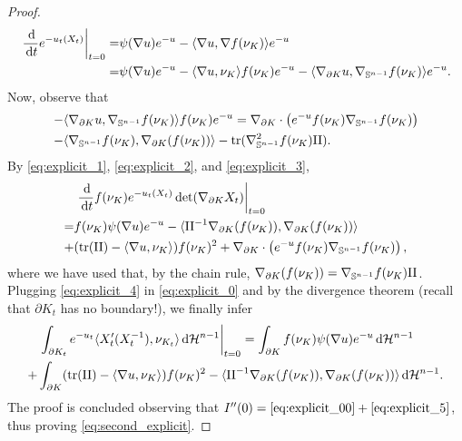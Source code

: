 \documentclass[a4paper, 11pt]{article}
\newcommand{\sph}{\mathbb{S}}
\newcommand{\haus}{\mathcal{H}}
\newcommand{\tra}{\mathrm{tr}}
\theoremstyle{definition}
\newcommand{\di}{\, \mathrm{d}}
\begin{document}
\begin{proof}
    \begin{align}\label{eq:explicit_2}
        \left. \frac{\di}{ \di t} e^{-u_t(X_t)}\right|_{t=0} = & \psi(\nabla u)e^{-u}-\langle \nabla u,  \nabla f(\nu_K)\rangle e^{-u} \\ = & \psi(\nabla u)e^{-u}-\langle \nabla u, \nu_K\rangle f(\nu_K) e^{-u}-\langle \nabla_{\partial K} u, \nabla_{\sph^{n-1}} f(\nu_K) \rangle e^{-u}. \notag
    \end{align}
    Now, observe that
    \begin{align} \label{eq:explicit_3}
        -&\langle \nabla_{\partial K} u, \nabla_{\sph^{n-1}} f(\nu_K) \rangle f(\nu_K) e^{-u}=\nabla_{\partial K} \cdot \left(e^{-u}f(\nu_K)\nabla_{\sph^{n-1}} f(\nu_K) \right)\\- &\langle \nabla_{\sph^{n-1}}f(\nu_K),\nabla_{\partial K}(f(\nu_K))\rangle -  \tra( \nabla_{\sph^{n-1}}^2 f (\nu_K){\rm II}). \notag
    \end{align}
    By \eqref{eq:explicit_1}, \eqref{eq:explicit_2}, and \eqref{eq:explicit_3}, 
    \begin{align}
       & \left. \frac{\di}{\di t}  f(\nu_K)e^{-u_t(X_t)} \det( \nabla_{\partial K} X_t) \right|_{t=0} \notag \\ \label{eq:explicit_4}
        = & f(\nu_K)\psi(\nabla u) e^{-u} -\langle {\rm II}^{-1}\nabla_{\partial K} (f(\nu_K)),\nabla_{\partial K} (f(\nu_K))\rangle\\+&(\tra({\rm II})-\langle \nabla u, \nu_K \rangle)f(\nu_K)^2 +\nabla_{\partial K} \cdot \left(e^{-u}f(\nu_K)\nabla_{\sph^{n-1}} f(\nu_K) \right), \notag
    \end{align}
    where we have used that, by the chain rule, $\nabla_{\partial K} (f(\nu_K))= \nabla_{\sph^{n-1}}f(\nu_K)  {\rm II}$. Plugging \eqref{eq:explicit_4} in \eqref{eq:explicit_0} and by the divergence theorem (recall that $\partial K_{t}$ has no boundary!), we finally infer 
    \begin{align} \label{eq:explicit_5}
        &\left. \int_{\partial K_t} e^{-u_t} \langle X'_t(X^{-1}_t),\nu_{K_t} \rangle \di \haus^{n-1} \right|_{t=0}=  \int_{\partial K}  f(\nu_K)\psi(\nabla u) e^{-u} \di \haus^{n-1}
        \\ + &\int_{\partial K}(\tra({\rm II})- \langle \nabla u, \nu_K \rangle)f(\nu_K)^2- \langle {\rm II}^{-1}\nabla_{\partial K} (f(\nu_K)),\nabla_{\partial K} (f(\nu_K))\rangle \di \haus^{n-1}. \notag
    \end{align}
    The proof is concluded observing that $I''(0)=\eqref{eq:explicit_00}+\eqref{eq:explicit_5}$, thus proving \eqref{eq:second_explicit}.
\end{proof}
\end{document}
